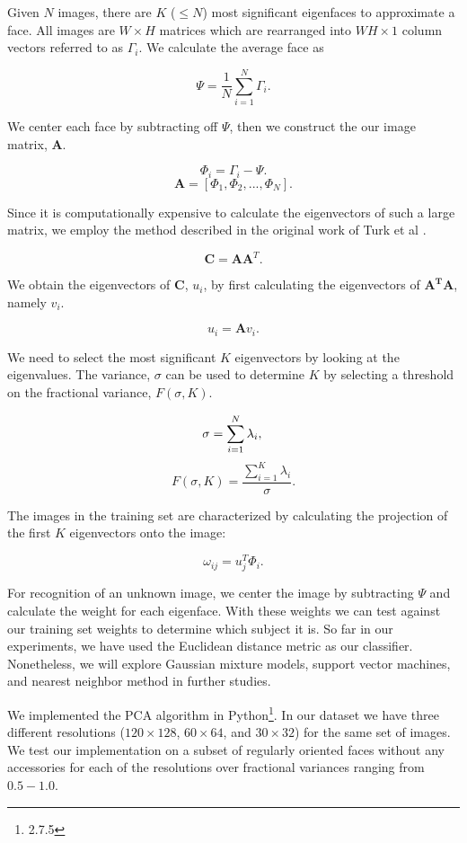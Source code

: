 \documentclass{article} %
\begin{document}
Given $N$ images, there are $K$ ($\leq N$) most significant eigenfaces to approximate a face. All images are $W \times H$ matrices which are rearranged into $W H \times 1$ column vectors referred to as $\Gamma_i$.  We calculate the average face as

\[
	\Psi = \frac{1}{N} \sum_{i = 1}^{N} \Gamma_i.
\]

We center each face by subtracting off $\Psi$, then we construct the our image matrix, $\mathbf{A}$.

\[ 
	\Phi_i = \Gamma_i - \Psi.
\]
\[
	\mathbf{A} = \left[ \Phi_1, \Phi_2, ..., \Phi_N \right].
\]

Since it is computationally expensive to calculate the eigenvectors of such a large matrix, we employ the method described in the original work of Turk et al \cite{tur91}.  

\[
	\mathbf{C} = \mathbf{A} \mathbf{A}^T.
\]

We obtain the eigenvectors of $\mathbf{C}$, $u_i$, by first calculating the eigenvectors of $\mathbf{A^T A}$, namely $v_i$.  

\[
	u_i = \mathbf{A} v_i.
\]

We need to select the most significant $K$ eigenvectors by looking at the eigenvalues.  The variance, $\sigma$ can be used to determine $K$ by selecting a threshold on the fractional variance, $F(\sigma, K)$.

\[
	\sigma = \sum_{i=1}^{N} \lambda_i, \\
\]
\[
	F(\sigma, K) = \frac{\sum_{i=1}^{K} \lambda_i}{\sigma}.
\]

The images in the training set are characterized by calculating the projection of the first $K$ eigenvectors onto the image:

\[
	\omega_{ij} = u_j^T \Phi_i.
\]

For recognition of an unknown image, we center the image by subtracting $\Psi$ and calculate the weight for each eigenface.  With these weights we can test against our training set weights to determine which subject it is.  So far in our experiments, we have used the Euclidean distance metric as our classifier. Nonetheless, we will explore Gaussian mixture models, support vector machines, and nearest neighbor method in further studies.

We implemented the PCA algorithm in Python\footnote{2.7.5}. In our dataset we have three different resolutions ($120\times128$, $60\times64$, and $30\times32$) for the same set of images.  We test our implementation on a subset of regularly oriented faces without any accessories for each of the resolutions over fractional variances ranging from $0.5 - 1.0$.
\end{document}
